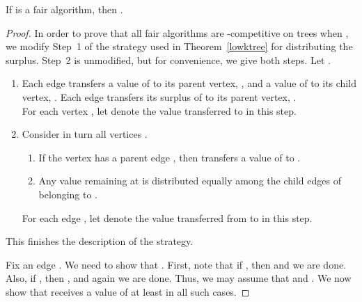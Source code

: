 \documentclass[smallextended]{svjour3}
\begin{document}
\begin{theorem}
\label{FAIRk3}
If  is a fair algorithm, then .
\end{theorem}
\begin{proof}
In order to prove that all fair algorithms are -competitive on trees when , we modify Step~1 of the strategy used in Theorem~\ref{lowktree} for distributing the surplus.  Step~2 is unmodified, but for convenience, we give both steps. Let .
\begin{enumerate}[Step 1:]
\item Each edge  transfers a value of  to its parent vertex, , and a value of  to its child vertex, . Each edge  transfers its surplus of  to its parent vertex, .\\
 For each vertex , let  denote the value transferred to 
  in this step. 
\item Consider in turn all vertices . 
  \begin{enumerate}
  \item If the vertex  has a parent edge , then  transfers a
    value of  to .
  \item Any value remaining at  is distributed equally among the
    child edges of  belonging to .
  \end{enumerate}
  For each edge , let  denote the value transferred from  to  in this step.
\end{enumerate}
This finishes the description of the strategy. 

Fix an edge . We need to show that . First, note that if , then  and we are done. Also, if , then , and again we are done. Thus, we may assume that  and . We now show that  receives a value of at least  in all such cases.


\end{proof}
\end{document}
